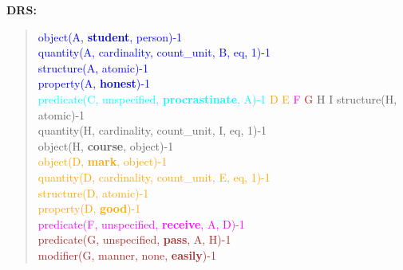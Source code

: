 \documentclass[12pt]{report}
\begin{document}
\textbf{DRS:}
\begin{quote}
\drs{~}
{
 \turqdownifdrs{\textcolor{blue}{A B}}
 {
   \textcolor{blue}{object(A, \textbf{student}, person)-1}\\
   \textcolor{blue}{quantity(A, cardinality, count\_unit, B, eq, 1)-1}\\
   \textcolor{blue}{structure(A, atomic)-1}\\
   \textcolor{blue}{property(A, \textbf{honest})-1}\\
   \rednegdrs{\textcolor{cyan}{C}}
   {
    \textcolor{cyan}{predicate(C, unspecified, \textbf{procrastinate}, A)-1}
   }
 }
 {
 	\textcolor{orange}{D E}
 	\textcolor{magenta}{F} \textcolor{brown}{G}
 	\textcolor{peach}{H I}
 }
 {
   \textcolor{peach}{structure(H, atomic)-1}\\
   \textcolor{peach}{quantity(H, cardinality, count\_unit, I, eq, 1)-1}\\
   \textcolor{peach}{object(H, \textbf{course}, object)-1}\\
   \textcolor{orange}{object(D, \textbf{mark}, object)-1}\\
   \textcolor{orange}{quantity(D, cardinality, count\_unit, E, eq, 1)-1}\\
   \textcolor{orange}{structure(D, atomic)-1}\\
   \textcolor{orange}{property(D, \textbf{good})-1}\\
   \textcolor{magenta}{predicate(F, unspecified, \textbf{receive}, A, D)-1}\\
   \textcolor{brown}{predicate(G, unspecified, \textbf{pass}, A, H)-1}\\
   \textcolor{brown}{modifier(G, manner, none, \textbf{easily})-1}
 }
}
\end{quote}
\end{document}
